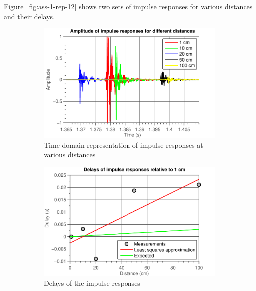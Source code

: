 \documentclass[11pt,titlepage]{report}
\begin{document}
Figure~\ref{fig:ass-1-rep-12} shows two sets of impulse responses for various distances and their delays.

\begin{figure}[H]
	\centering
	\begin{subfigure}{0.49\textwidth}
		\includegraphics[width=\textwidth]{../../deliverable-7-resources/figures/ass-1/report-11-12-13/ass-1-report-13-time.pdf}
		\caption{\centering Time-domain representation of impulse responses at various distances}
	\end{subfigure}
	\begin{subfigure}{0.49\textwidth}
		\includegraphics[width=\textwidth]{../../deliverable-7-resources/figures/ass-1/report-11-12-13/ass-1-report-13-delays.pdf}
		\caption{Delays of the impulse responses}
	\end{subfigure}
	\begin{subfigure}{0.49\textwidth}

\end{subfigure}
\end{figure}
\end{document}
